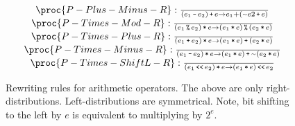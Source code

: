 \begin{figure*}[htbp!]

\[
\begin{matrix}
\proc{P-Plus-Minus-R}:{\over
\p{e_1 \lm e_2}\lp e \rightarrow e_1 + \p{\lneg e2 \lp e}
}\\
\proc{P-Times-Mod-R}:{\over
\p{e_1 \lmod e_2}\lt e \rightarrow \p{ e_1 \lt e } \lmod \p{ e_2 \lt e }
}\\
\proc{P-Times-Plus-R}:{\over
\p{e_1 \lp e_2}\lt e \rightarrow \p{ e_1 \lt e } \lp \p{ e_2 \lt e }
}\\
\proc{P-Times-Minus-R}:{\over
\p{e_1 \lm e_2}\lt e \rightarrow \p{ e_1 \lt e } \lp \lneg\p{ e_2 \lt e }
}\\
\proc{P-Times-ShiftL-R}:{\over
\p{e_1 \LBSL e_2}\lt e \rightarrow \p{ e_1 \lt e } \LBSL e_2
}\\
\end{matrix}
\]
\caption[]{Rewriting rules for arithmetic operators. The above are only
right-distributions. Left-distributions are symmetrical. Note, bit shifting to
the left by $e$ is equivalent to multiplying by $2^e$.}
\label{figure:rewriting-arithop}
\end{figure*}








